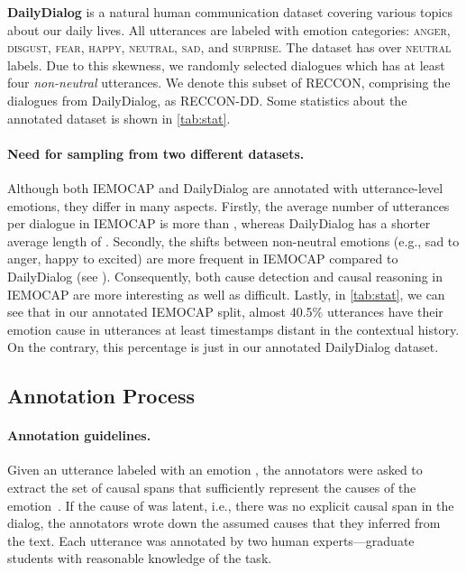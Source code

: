 \documentclass[11pt,a4paper]{article}
\theoremstyle{definition}
\newcommand\emo[1]{\textsc{#1}}
\newcommand\RECCONDA{RECCON}
\newcommand\RECCONDADD{RECCON-DD}
\begin{document}
\textbf{DailyDialog} is a natural human communication dataset covering various topics about our daily lives. All utterances are labeled with emotion categories: \emo{anger}, \emo{disgust}, \emo{fear}, \emo{happy}, \emo{neutral}, \emo{sad}, and \emo{surprise}. The dataset has over  \emo{neutral} labels. Due to this skewness, we randomly selected dialogues which has at least four \textit{non-neutral} utterances. We denote this subset of \RECCONDA{}, comprising the dialogues from DailyDialog, as \RECCONDADD. Some statistics about the annotated dataset is shown in \cref{tab:stat}.

\paragraph{Need for sampling from two different datasets.} \label{sec:dataset_diffs}
Although both IEMOCAP and DailyDialog are annotated with utterance-level emotions, they differ in many aspects. Firstly, the average number of utterances per dialogue in IEMOCAP is more than , whereas DailyDialog has a shorter average length of . Secondly, the shifts between non-neutral emotions (e.g., sad to anger, happy to excited) are more frequent in IEMOCAP compared to DailyDialog (see \citep{ghosal2020utterancelevel}). Consequently, both cause detection and causal reasoning in IEMOCAP are more interesting as well as difficult. Lastly, in \cref{tab:stat}, we can see that in our annotated IEMOCAP split, almost 40.5\% utterances have their emotion cause in utterances at least  timestamps distant in the contextual history. On the contrary, this percentage is just  in our annotated DailyDialog dataset. 

\subsection{Annotation Process}\label{sec:annot}
\paragraph{Annotation guidelines.}
Given an utterance  labeled with an emotion , the annotators were asked to extract the set of causal spans  
that sufficiently represent the causes of the emotion~. If the cause of  was latent, i.e., there was no explicit causal span in the dialog,
the annotators wrote down the assumed causes that they inferred from the text. Each utterance was annotated by two human experts---graduate students with reasonable knowledge of the task.
\end{document}
